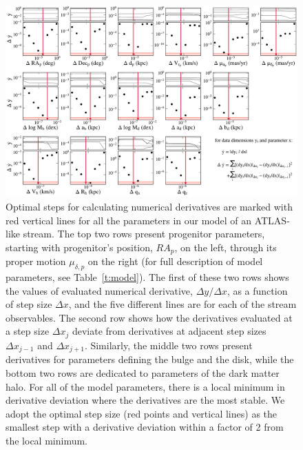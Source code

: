 \documentclass[modern]{aastex62}
\begin{document}
\begin{figure}
\begin{center}
\includegraphics[width=\textwidth]{derivative_steps.pdf}
\caption{Optimal steps for calculating numerical derivatives are marked with red vertical lines for all the parameters in our model of an ATLAS-like stream.
The top two rows present progenitor parameters, starting with progenitor's position, $RA_p$, on the left, through its proper motion $\mu_{\delta,p}$ on the right (for full description of model parameters, see Table~\ref{t:model}).
The first of these two rows shows the values of evaluated numerical derivative, $\Delta y/\Delta x$, as a function of step size $\Delta x$, and the five different lines are for each of the stream observables. 
The second row shows how the derivatives evaluated at a step size $\Delta x_j$ deviate from derivatives at adjacent step sizes $\Delta x_{j-1}$ and $\Delta x_{j+1}$.
Similarly, the middle two rows present derivatives for parameters defining the bulge and the disk, while the bottom two rows are dedicated to parameters of the dark matter halo.
For all of the model parameters, there is a local minimum in derivative deviation where the derivatives are the most stable.
We adopt the optimal step size (red points and vertical lines) as the smallest step with a derivative deviation within a factor of 2 from the local minimum.
}
\label{fig:derivative_conv}
\end{center}
\end{figure}
\end{document}
